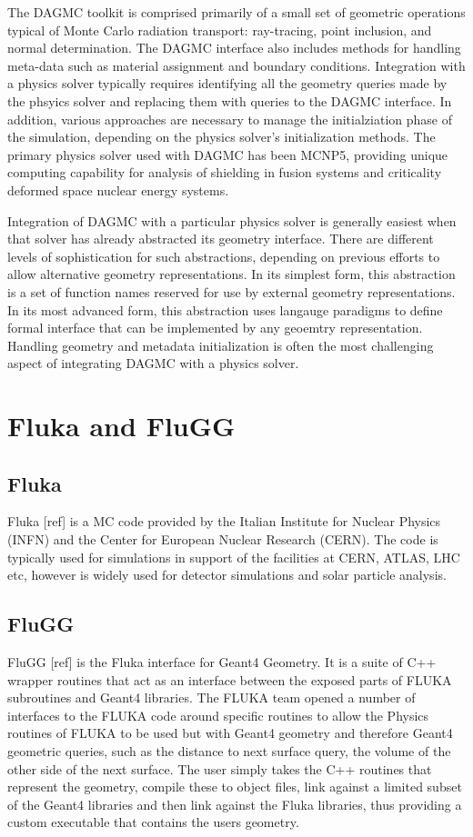 \documentclass{anstrans}
\begin{document}
The DAGMC toolkit is comprised primarily of a small set of geometric
operations typical of Monte Carlo radiation transport: ray-tracing,
point inclusion, and normal determination.  The DAGMC interface also
includes methods for handling meta-data such as material assignment
and boundary conditions.  Integration with a physics solver typically
requires identifying all the geometry queries made by the phsyics
solver and replacing them with queries to the DAGMC interface.  In
addition, various approaches are necessary to manage the
initialziation phase of the simulation, depending on the physics
solver's initialization methods.  The primary physics solver used with
DAGMC has been MCNP5, providing unique computing capability for
analysis of shielding in fusion systems\cite{fusion3d} and criticality
deformed space nuclear energy systems\cite{nets}.

Integration of DAGMC with a particular physics solver is generally
easiest when that solver has already abstracted its geometry
interface.  There are different levels of sophistication for such
abstractions, depending on previous efforts to allow alternative
geometry representations.  In its simplest form, this abstraction is a
set of function names reserved for use by external geometry
representations.  In its most advanced form, this abstraction uses
langauge paradigms to define formal interface that can be implemented
by any geoemtry representation.  Handling geometry and metadata
initialization is often the most challenging aspect of integrating
DAGMC with a physics solver.

\section{Fluka and FluGG}
\subsection{Fluka}
Fluka [ref] is a MC code provided by the Italian Institute for Nuclear
 Physics (INFN) and the Center for European Nuclear Research (CERN). The
  code is typically used for simulations in support of the facilities at   CERN, ATLAS, LHC etc, however is widely used for detector 
simulations and solar particle analysis. 
\subsection{FluGG}
FluGG [ref] is the Fluka interface for Geant4 Geometry. It is a suite
 of C++ wrapper routines that act as an interface between the exposed 
 parts of FLUKA subroutines and Geant4 libraries. The FLUKA team opened a
 number of interfaces to the FLUKA code around specific routines to allow the Physics routines of FLUKA to be used but with Geant4 geometry and
  therefore Geant4 geometric queries, such as the distance to next surface 
  query, the volume of the other side of the next surface. The user simply 
  takes the C++ routines that represent the geometry, compile these to 
  object files, link against a limited subset of the Geant4 libraries and
   then link against the Fluka libraries, thus providing a custom executable
   that contains the users geometry. 
\end{document}
